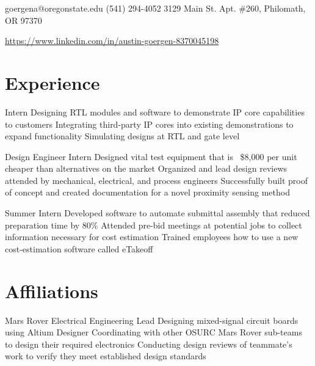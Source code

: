 \documentclass{my_cv}
\begin{document}

\contact
{goergena@oregonstate.edu}
{(541) 294-4052}
{3129 Main St. Apt. \#260, Philomath, OR 97370}

\vspace{-0.5em}

\begin{center}
\href{https://www.linkedin.com/in/austin-goergen-8370045198}{https://www.linkedin.com/in/austin-goergen-8370045198}
\end{center}

\section{Experience}

\vspace{-0.75em}
Intern
\workitems
    {Designing RTL modules and software to demonstrate IP core capabilities to customers}
    {Integrating third-party IP cores into existing demonstrations to expand functionality}
    {Simulating designs at RTL and gate level}


\vspace{-0.75em}
Design Engineer Intern
\workitems
    {Designed vital test equipment that is ~\$8,000 per unit cheaper than alternatives on the market}
    {Organized and lead design reviews attended by mechanical, electrical, and process engineers}
    {Successfully built proof of concept and created documentation for a novel proximity sensing method}

\vspace{-0.75em}
Summer Intern
\workitems
    {Developed software to automate submittal assembly that reduced preparation time by 80\%}
    {Attended pre-bid meetings at potential jobs to collect information necessary for cost estimation}
    {Trained employees how to use a new cost-estimation software called eTakeoff}

\section{Affiliations}

\vspace{-0.75em}
Mars Rover Electrical Engineering Lead
\workitems
    {Designing mixed-signal circuit boards using Altium Designer}
    {Coordinating with other OSURC Mars Rover sub-teams to design their required electronics}
    {Conducting design reviews of teammate's work to verify they meet established design standards}
\end{document}

